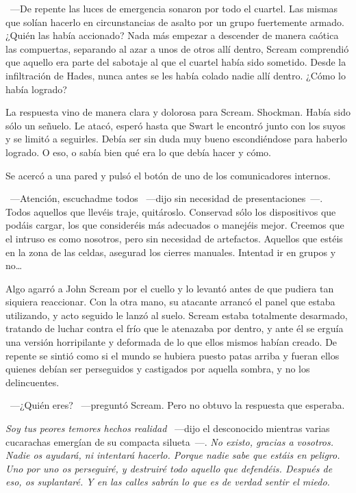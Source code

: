 ~---De repente las luces de emergencia sonaron por todo el cuartel. Las mismas que solían hacerlo en circunstancias de asalto por un grupo fuertemente armado. ¿Quién las había accionado? Nada más empezar a descender de manera caótica las compuertas, separando al azar a unos de otros allí dentro, Scream comprendió que aquello era parte del sabotaje al que el cuartel había sido sometido. Desde la infiltración de Hades, nunca antes se les había colado nadie allí dentro. ¿Cómo lo había logrado?

La respuesta vino de manera clara y dolorosa para Scream. Shockman. Había sido sólo un señuelo. Le atacó, esperó hasta que Swart le encontró junto con los suyos y se limitó a seguirles. Debía ser sin duda muy bueno escondiéndose para haberlo logrado. O eso, o sabía bien qué era lo que debía hacer y cómo.

Se acercó a una pared y pulsó el botón de uno de los comunicadores internos.

~---Atención, escuchadme todos ~---dijo sin necesidad de presentaciones~---. Todos aquellos que llevéis traje, quitároslo. Conservad sólo los dispositivos que podáis cargar, los que consideréis más adecuados o manejéis mejor. Creemos que el intruso es como nosotros, pero sin necesidad de artefactos. Aquellos que estéis en la zona de las celdas, asegurad los cierres manuales. Intentad ir en grupos y no\dots

Algo agarró a John Scream por el cuello y lo levantó antes de que pudiera tan siquiera reaccionar. Con la otra mano, su atacante arrancó el panel que estaba utilizando, y acto seguido le lanzó al suelo. Scream estaba totalmente desarmado, tratando de luchar contra el frío que le atenazaba por dentro, y ante él se erguía una versión horripilante y deformada de lo que ellos mismos habían creado. De repente se sintió como si el mundo se hubiera puesto patas arriba y fueran ellos quienes debían ser perseguidos y castigados por aquella sombra, y no los delincuentes.

~---¿Quién eres? ~---preguntó Scream. Pero no obtuvo la respuesta que esperaba.

\emph{Soy tus peores temores hechos realidad} ~---dijo el desconocido mientras varias cucarachas emergían de su compacta silueta~---. \emph{No existo, gracias a vosotros. Nadie os ayudará, ni intentará hacerlo. Porque nadie sabe que estáis en peligro. Uno por uno os perseguiré, y destruiré todo aquello que defendéis. Después de eso, os suplantaré. Y en las calles sabrán lo que es de verdad sentir el miedo.}

